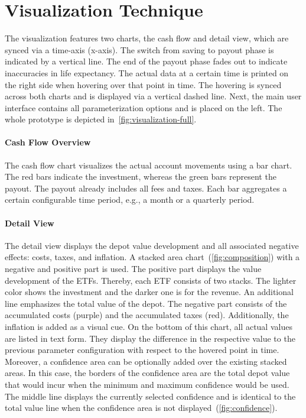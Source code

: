 \documentclass[sigconf%
,natbib=true%
]{acmart}
\begin{document}
\section{Visualization Technique}
The visualization features two charts, the cash flow and detail view, which are synced via a time-axis (x-axis).
The switch from saving to payout phase is indicated by a vertical line.
The end of the payout phase fades out to indicate inaccuracies in life expectancy.
The actual data at a certain time is printed on the right side when hovering over that point in time. 
The hovering is synced across both charts and is displayed via a vertical dashed line.
Next, the main user interface contains all parameterization options and is placed on the left.
The whole prototype is depicted in~\autoref{fig:visualization-full}.

\paragraph{Cash Flow Overview}
The cash flow chart visualizes the actual account movements using a bar chart.
The red bars indicate the investment, whereas the green bars represent the payout.
The payout already includes all fees and taxes. 
Each bar aggregates a certain configurable time period, e.g., a month or a quarterly period.

\paragraph{Detail View}
The detail view displays the depot value development and all associated negative effects: costs, taxes, and inflation.
A stacked area chart~(\autoref{fig:composition}) with a negative and positive part is used.
The positive part displays the value development of the ETFs.
Thereby, each ETF consists of two stacks. 
The lighter color shows the investment and the darker one is for the revenue. 
An additional line emphasizes the total value of the depot. 
The negative part consists of the accumulated costs (purple) and the accumulated taxes (red). 
Additionally, the inflation is added as a visual cue.
On the bottom of this chart, all actual values are listed in text form. 
They display the difference in the respective value to the previous parameter configuration with respect to the hovered point in time.
Moreover, a confidence area can be optionally added over the existing stacked areas. 
In this case, the borders of the confidence area are the total depot value that would incur when the minimum and maximum confidence would be used.
The middle line displays the currently selected confidence and is identical to the total value line when the confidence area is not displayed~(\autoref{fig:confidence}).
\end{document}
